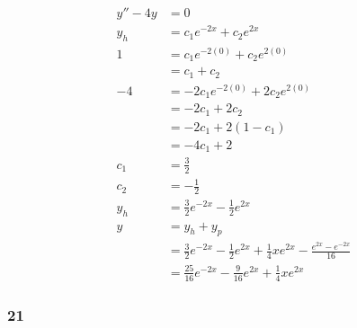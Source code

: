 \documentclass{article}
\begin{document}
\begin{align*}
  y'' - 4y & = 0                                                                                             \\
  y_h      & = c_1 e^{-2x} + c_2 e^{2x}                                                                      \\
  1        & = c_1 e^{-2 (0)} + c_2 e^{2 (0)}                                                                \\
           & = c_1 + c_2                                                                                     \\
  -4       & = -2 c_1 e^{-2 (0)} + 2 c_2 e^{2 (0)}                                                           \\
           & = -2 c_1 + 2 c_2                                                                                \\
           & = -2 c_1 + 2 (1 - c_1)                                                                          \\
           & = -4 c_1 + 2                                                                                    \\
  c_1      & = \frac{3}{2}                                                                                   \\
  c_2      & = -\frac{1}{2}                                                                                  \\
  y_h      & = \frac{3}{2} e^{-2x} - \frac{1}{2} e^{2x}                                                      \\
  y        & = y_h + y_p                                                                                     \\
           & = \frac{3}{2} e^{-2x} - \frac{1}{2} e^{2x} + \frac{1}{4} x e^{2x} - \frac{e^{2x} - e^{-2x}}{16} \\
           & = \frac{25}{16} e^{-2x} - \frac{9}{16} e^{2x} + \frac{1}{4} x e^{2x}
\end{align*}

\subsubsection{21}
\end{document}
